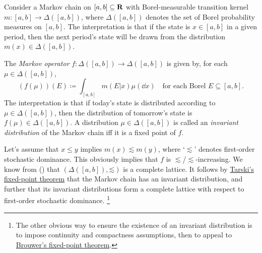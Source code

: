 \begin{example}[Markov chains]
	\label{example:markov_ch}
	Consider a Markov chain on $[a,b] \subseteq \mathbf{R}$ with Borel-measurable transition kernel $m : [a,b] \to \Delta([a,b])$, where $\Delta([a,b])$ denotes the set of Borel probability measures on $[a,b]$. The interpretation is that if the state is $x \in [a,b]$ in a given period, then the next period's state will be drawn from the distribution $m(x) \in \Delta([a,b])$.

	The \emph{Markov operator} $f : \Delta([a,b]) \to \Delta([a,b])$ is given by, for each $\mu \in \Delta([a,b])$,
	\begin{equation*}
		(f(\mu))(E) \coloneqq \int_{[a,b]} m(E|x) \mu(\dd x)
		\quad\text{for each Borel $E\subseteq [a,b]$.} 
	\end{equation*}
	The interpretation is that if today's state is distributed according to $\mu \in \Delta([a,b])$, then the distribution of tomorrow's state is $f(\mu) \in \Delta([a,b])$. A distribution $\mu \in \Delta([a,b])$ is called an \emph{invariant distribution} of the Markov chain iff it is a fixed point of $f$.

	Let's assume that $x \leq y$ implies $m(x) \lesssim m(y)$, where `$\lesssim$' denotes first-order stochastic dominance. This obviously implies that $f$ is $\lesssim$/$\lesssim$-increasing. We know from  () that $( \Delta([a,b]), \mathord{\lesssim} )$ is a complete lattice. It follows by \hyperref[theorem:tarski]{Tarski's fixed-point theorem} that the Markov chain has an invariant distribution, and further that its invariant distributions form a complete lattice with respect to first-order stochastic dominance.%
		\footnote{The other obvious way to ensure the existence of an invariant distribution is to impose continuity and compactness assumptions, then to appeal to \hyperref[item:fpt_browuer]{Brouwer's fixed-point theorem}.}
\end{example}

